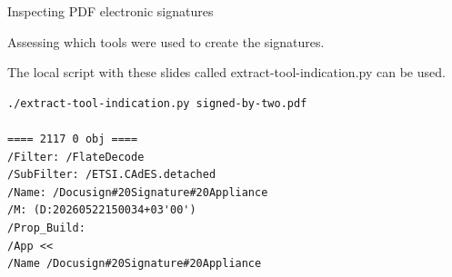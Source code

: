 \begin{frame}[fragile]{Inspecting PDF electronic signatures}

Assessing which tools were used to create the signatures.

The local script with these slides called \alert{extract-tool-indication.py} can be used.

\begin{verbatim}
./extract-tool-indication.py signed-by-two.pdf

==== 2117 0 obj ====
/Filter: /FlateDecode
/SubFilter: /ETSI.CAdES.detached
/Name: /Docusign#20Signature#20Appliance
/M: (D:20260522150034+03'00')
/Prop_Build:
/App <<
/Name /Docusign#20Signature#20Appliance

\end{verbatim}
\end{frame}

\small
